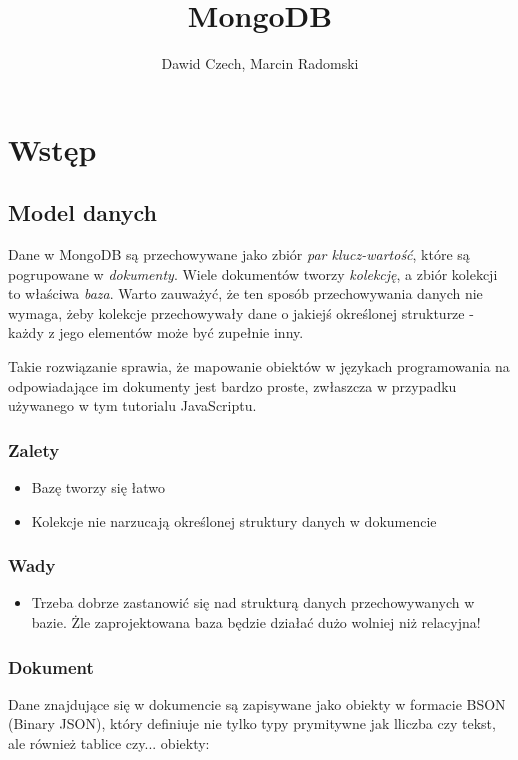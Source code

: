 \documentclass[10pt,a4paper]{article}
\author{Dawid Czech, Marcin Radomski}
\title{MongoDB}
\begin{document}
\maketitle
\newpage

\section{Wstęp}
\subsection{Model danych}
Dane w MongoDB są przechowywane jako zbiór \emph{par klucz-wartość}, które są pogrupowane w \emph{dokumenty}. Wiele dokumentów tworzy \emph{kolekcję}, a zbiór kolekcji to właściwa \emph{baza}. Warto zauważyć, że ten sposób przechowywania danych nie wymaga, żeby kolekcje przechowywały dane o jakiejś określonej strukturze - każdy z jego elementów może być zupełnie inny.

Takie rozwiązanie sprawia, że mapowanie obiektów w językach programowania na odpowiadające im dokumenty jest bardzo proste, zwłaszcza w przypadku używanego w tym tutorialu JavaScriptu.

\subsubsection{Zalety}
\begin{itemize}
\item Bazę tworzy się łatwo
\item Kolekcje nie narzucają określonej struktury danych w dokumencie
\end{itemize}

\subsubsection{Wady}
\begin{itemize}
\item Trzeba dobrze zastanowić się nad strukturą danych przechowywanych w bazie. Żle zaprojektowana baza będzie działać dużo wolniej niż relacyjna!
\end{itemize}

\subsubsection{Dokument}
Dane znajdujące się w dokumencie są zapisywane jako obiekty w formacie BSON (Binary JSON), który definiuje nie tylko typy prymitywne jak lliczba czy tekst, ale również tablice czy... obiekty:
\end{document}
